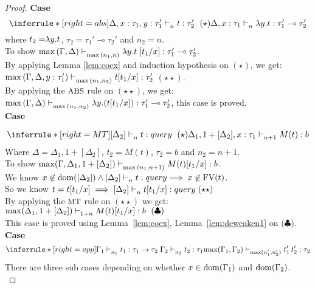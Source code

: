 \documentclass{article}
\begin{document}
\begin{proof}
\noindent \textbf{Case} 
$$
    \inferrule*[right = abs]
   {\Delta, x: \tau_1, y: \tau_1' \jtype{n}{}{t}{\tau_2'}~(\star)}
   { \Delta, x: \tau_1 \jtype{n}{}{\abs{y}{t}}{\tau_1' \multimap \tau_2'}  }
$$
where $t_2 = \mathrel { \lambda {y} . {t} }$, $\tau_2 = \tau_1' \multimap \tau_2'$ and $n_2 = n$.\\
To show $\max{(\Gamma, \Delta)} \mathrel{\vdash_{\max{(n_1, n)}}^{} {\mathrel { \lambda {y} . {t} }[t_1/x]} : {\tau_1' \multimap \tau_2'}}$.\\
By applying Lemma \ref{lem:coex}  and induction hypothesis on $(\star)$, we get:\\ $\max{(\Gamma, \Delta,  y: \tau_1')} \mathrel{\vdash_{\max{(n_1, n_2)}}^{} {{t}[t_1/x]} : { \tau_2'}}$ $(\star \star)$.\\
By applying the $\mbox{\small{ABS}}$ rule on $(\star \star)$, we get: $\max{(\Gamma, \Delta)} \mathrel{\vdash_{\max{(n_1, n_2)}}^{} {\mathrel { \lambda {y} . {({t}[t_1/x])} }} : {\tau_1' \multimap \tau_2'}}$, this case is proved.\\

\noindent \textbf{Case} 

$$
   \inferrule*[ right = MT ]
   {[\Delta_2] \jtype{n}{}{t}{query} ~ (\star)}
   {\Delta_1, 1 + [\Delta_2], x: \tau_1 \jtype{n+1}{}{M(t)}{b}  }
$$
Where $\Delta = \Delta_1, 1 + [\Delta_2] $, $t_2 = M(t)$, $\tau_2 = b$  and $n_2 = n + 1$.\\
To show $\max(\Gamma, \Delta_1, 1 + [\Delta_2]) \mathrel{\vdash_{\max{(n_1, n + 1)}}^{} {M(t)[t_1/x]} : {b}} $.\\
We know $x \not \in \text{dom}([\Delta_2]) \land [\Delta_2] \mathrel{\vdash_{n}^{} {t} : {query}}  \implies x \not \in \text{FV}(t) $. \\
So we know $t = t[t_1/x] \implies [\Delta_2] \jtype{n}{}{t[t_1/x]}{query}(\star\star)$ \\
By applying the $\mbox{\small{MT}}$ rule on $(\star \star)$ we get:\\
$\max(\Delta_1, 1 + [\Delta_2]) \mathrel{\vdash_{1 + n}^{} {M(t)[t_1/x]} : {b}}~(\clubsuit)$\\
This case is proved using Lemma~\ref{lem:coex}, Lemma~\ref{lem:deweaken1} on ($\clubsuit$).\\


\noindent \textbf{Case} 
$$
  \inferrule*[ right = app ]
   {\Gamma_1 \jtype{n_1}{}{t_1}{\tau_1 \rightarrow \tau_2} \\ \Gamma_2 \jtype{n_2}{}{t_2}{\tau_1}}
   { \max(\Gamma_1, \Gamma_2) \jtype{\max(n_1',n_2')}{}{\app{t_1'}{t_2'}}{\tau_2}  }
$$
There are three sub cases depending on whether $x \in \text{dom}(\Gamma_1)$ and $\text{dom}(\Gamma_2)$.\\


\end{proof}
\end{document}
